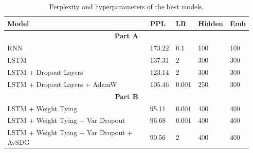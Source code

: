 \documentclass[a4paper]{article}
\begin{document}
\begin{table}[h!]
  \centering
  \begin{tabular}{l p{1 cm} p{1 cm} p{1 cm} p{1 cm}}
      \midrule
      \textbf{Model} & \textbf{PPL} & \textbf{LR} & \textbf{Hidden} & \textbf{Emb} \\
      \midrule
      \multicolumn{5}{c}{\textbf{Part A}} \\
      RNN                     & 173.22 & 0.1    & 100 & 100 \\
      LSTM                    & 137.31 & 2      & 300 & 300 \\
      LSTM + Dropout Layers      & 123.14 & 2      & 300 & 300 \\
      LSTM + Dropout Layers + AdamW & 105.46 & 0.001 & 250 & 300 \\
      \midrule
      \multicolumn{5}{c}{\textbf{Part B}} \\
      \midrule
      LSTM + Weight Tying & 95.11 & 0.001 & 400 & 400 \\
      LSTM + Weight Tying + Var Dropout & 96.68 & 0.001 & 400 & 400 \\
      LSTM + Weight Tying + Var Dropout + AvSDG & 90.56 & 2 & 400 & 400 \\
      \bottomrule
  \end{tabular}
  \caption{Perplexity and hyperparameters of the best models.}
  \label{tab:results}
\end{table}





\end{document}
